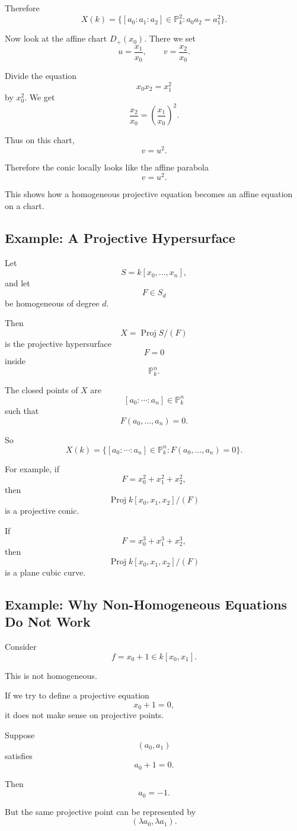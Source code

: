 \documentclass[12pt,a4paper]{article}
\DeclareMathOperator{\Proj}{Proj}
\newcommand{\PP}{\mathbb P}
\theoremstyle{notespace}
\begin{document}
Therefore
\[
\boxed{
	X(k)
	=
	\{[a_0:a_1:a_2]\in\PP_k^2:a_0a_2=a_1^2\}.
}
\]

Now look at the affine chart \(D_+(x_0)\). There we set
\[
u=\frac{x_1}{x_0},
\qquad
v=\frac{x_2}{x_0}.
\]

Divide the equation
\[
x_0x_2=x_1^2
\]
by \(x_0^2\). We get
\[
\frac{x_2}{x_0}
=
\left(\frac{x_1}{x_0}\right)^2.
\]

Thus on this chart,
\[
v=u^2.
\]

Therefore the conic locally looks like the affine parabola
\[
v=u^2.
\]

This shows how a homogeneous projective equation becomes an affine equation on a chart.

\subsection{Example: A Projective Hypersurface}

Let
\[
S=k[x_0,\dots,x_n],
\]
and let
\[
F\in S_d
\]
be homogeneous of degree \(d\).

Then
\[
X=\Proj S/(F)
\]
is the projective hypersurface
\[
F=0
\]
inside
\[
\PP_k^n.
\]

The closed points of \(X\) are
\[
[a_0:\cdots:a_n]\in \PP_k^n
\]
such that
\[
F(a_0,\dots,a_n)=0.
\]

So
\[
\boxed{
	X(k)
	=
	\{[a_0:\cdots:a_n]\in\PP_k^n:F(a_0,\dots,a_n)=0\}.
}
\]

For example, if
\[
F=x_0^2+x_1^2+x_2^2,
\]
then
\[
\Proj k[x_0,x_1,x_2]/(F)
\]
is a projective conic.

If
\[
F=x_0^3+x_1^3+x_2^3,
\]
then
\[
\Proj k[x_0,x_1,x_2]/(F)
\]
is a plane cubic curve.

\subsection{Example: Why Non-Homogeneous Equations Do Not Work}

Consider
\[
f=x_0+1\in k[x_0,x_1].
\]

This is not homogeneous.

If we try to define a projective equation
\[
x_0+1=0,
\]
it does not make sense on projective points.

Suppose
\[
(a_0,a_1)
\]
satisfies
\[
a_0+1=0.
\]

Then
\[
a_0=-1.
\]

But the same projective point can be represented by
\[
(\lambda a_0,\lambda a_1).
\]
\end{document}
